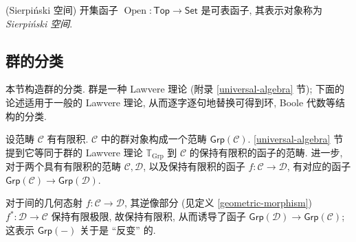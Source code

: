 \begin{propdef}
	[label={Sierpinski-space}]
	{(Sierpi\'nski 空间)}
	开集函子 $\operatorname{Open}\colon \mathsf {Top}\to \mathsf {Set}$ 是可表函子, 其表示对象称为 \emph{Sierpi\'nski 空间}.
\end{propdef}

\todo{}

\subsection{群的分类\topos{}}

本节构造群的分类\topos{}. 群是一种 Lawvere 理论 (附录 \ref{universal-algebra} 节); 下面的论述适用于一般的 Lawvere 理论, 从而逐字逐句地替换可得到环, Boole 代数等结构的分类\topos{}.
%


设范畴 $\mathcal C$ 有有限积. $\mathcal C$ 中的群对象构成一个范畴 $\mathsf {Grp}(\mathcal C)$.
\ref{universal-algebra} 节提到它等同于群的 Lawvere 理论 $\mathbb T_{\text{Grp}}$ 到 $\mathcal C$ 的保持有限积的函子的范畴.
进一步, 对于两个具有有限积的范畴 $\mathcal C,\mathcal D$, 以及保持有限积的函子 $f \colon \mathcal C \to \mathcal D$, 有对应的函子
$\mathsf {Grp}(\mathcal C) \to \mathsf {Grp}(\mathcal D)$.%

对于\topos{}间的几何态射 $f \colon \mathcal C \to \mathcal D$, 其逆像部分 (见定义 \ref{geometric-morphism}) $f^* \colon \mathcal D \to \mathcal C$ 保持有限极限, 故保持有限积, 从而诱导了函子 $\mathsf {Grp}(\mathcal D) \to \mathsf {Grp}(\mathcal C)$;
这表示 $\mathsf {Grp}(-)$ 关于\topos{}是 ``反变'' 的.

